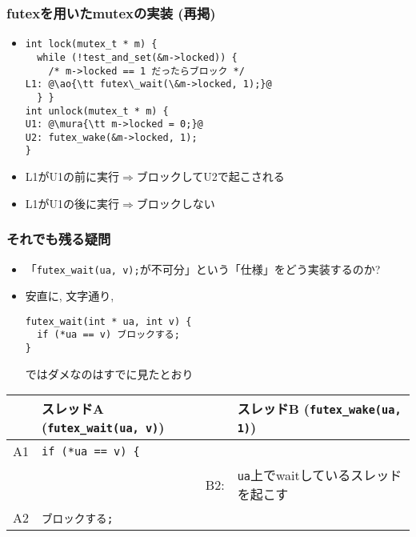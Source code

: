 \documentclass[12pt,dvipdfmx]{beamer}
\begin{document}
\begin{frame}[fragile]
  \frametitle{futexを用いたmutexの実装 (再掲)}
  \begin{itemize}
  \item []
\begin{lstlisting}
int lock(mutex_t * m) {
  while (!test_and_set(&m->locked)) {
    /* m->locked == 1 だったらブロック */
L1: @\ao{\tt futex\_wait(\&m->locked, 1);}@
  } }
int unlock(mutex_t * m) {
U1: @\mura{\tt m->locked = 0;}@
U2: futex_wake(&m->locked, 1);
}
\end{lstlisting}
\item L1がU1の前に実行$\Rightarrow$ブロックしてU2で起こされる
\item L1がU1の後に実行$\Rightarrow$ブロックしない
\end{itemize}

\end{frame}

\begin{frame}[fragile]
  \frametitle{それでも残る疑問}
  \begin{itemize}
  \item 「{\tt futex\_wait(ua, v);}が不可分」という「仕様」をどう実装するのか?
  \item 安直に, 文字通り, 
    \begin{lstlisting}
futex_wait(int * ua, int v) {
  if (*ua == v) ブロックする;
}
\end{lstlisting}
ではダメなのはすでに見たとおり
\end{itemize}

\begin{center}
  {\scriptsize
\begin{tabular}{|rl|rl|}
        & スレッドA ({\tt futex\_wait(ua, v)})
  &     & スレッドB ({\tt futex\_wake(ua, 1)})         \\\hline
A1  & {\tt if (*ua == v) \{} &     &                   \\
    &                        & B2: & {\tt ua}上でwaitしているスレッドを起こす \\
A2  & {\tt ブロックする;}    &     & \\
\end{tabular}}
\end{center}
\end{frame}
\end{document}
